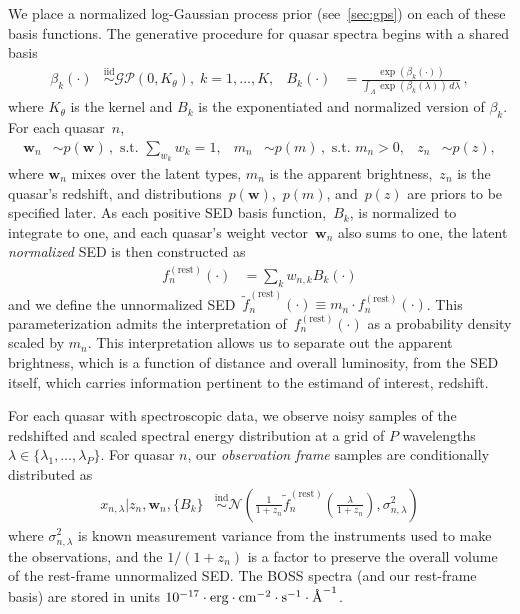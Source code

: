 \documentclass{article} %
\begin{document}
We place a normalized log-Gaussian process prior (see~\ref{sec:gps}) on each of these basis functions.  
The generative procedure for quasar spectra begins with a shared basis
\begin{align}
  \beta_k(\cdot) &\stackrel{\text{iid}}{\sim} \mathcal{GP}(0, K_\theta),\; k=1, \dots, K,&
  B_k(\cdot) &= \frac{\exp(\beta_k(\cdot))}{\int_\Lambda \exp(\beta_k(\lambda))\, d\lambda}   \, ,
\end{align}
where $K_{\theta}$ is the kernel and $B_k$ is the exponentiated and normalized version of $\beta_k$. For each quasar~$n$,
\begin{align}
  \mathbf{w}_n &\sim p(\mathbf{w}) \, , \text{ s.t. } \sum_{w_k} w_k = 1, &
  m_n  &\sim p(m) \, , \text{ s.t. } m_n > 0, &
  z_n &\sim p(z),
\end{align}
where $\mathbf{w}_n$ mixes over the latent types, $m_n$ is the apparent brightness,~$z_n$ is the quasar's redshift, and distributions~$p(\mathbf{w})$,~$p(m)$, and~$p(z)$ are priors to be specified later.
As each positive SED basis function,~$B_k$, is normalized to integrate to one, and each quasar's weight vector~$\mathbf{w}_n$ also sums to one, the latent \emph{normalized} SED is then constructed as
\begin{align}
  f^{(\text{rest})}_n(\cdot) &= \sum_{k} w_{n,k} B_k(\cdot)
  \label{eqn:restsed}
\end{align}
and we define the unnormalized SED~${\tilde f^{(\text{rest})}_n(\cdot) \equiv m_n \cdot f^{(\text{rest})}_n(\cdot)}$. 
This parameterization admits the interpretation of~$f^{(\text{rest})}_n(\cdot)$ as a probability density scaled by $m_n$.  
This interpretation allows us to separate out the apparent brightness, which is a function of distance and overall luminosity, from the SED itself, which carries information pertinent to the estimand of interest, redshift. 

For each quasar with spectroscopic data, we observe noisy samples of the redshifted and scaled spectral energy distribution at a grid of $P$ wavelengths ${\lambda \in \{\lambda_1, \dots, \lambda_P \}}$.
For quasar $n$, our \emph{observation frame} samples are conditionally distributed as
\begin{align}
  x_{n, \lambda} | z_n, \mathbf{w}_n, \{ B_k \} 
    &\stackrel{\textrm{ind}}{\sim} \mathcal{N}\left( \frac{1}{1 + z_n} \tilde f_n^{(\text{rest})}\left( \frac{\lambda}{1 + z_n} \right), \sigma_{n,\lambda}^2 \right)
    \label{eq:spec} 
\end{align}
where $\sigma_{n, \lambda}^2$ is known measurement variance from the instruments used to make the observations, and the $1/(1+z_n)$ is a factor to preserve the overall volume of the rest-frame unnormalized SED. 
The BOSS spectra (and our rest-frame basis) are stored in units ${10^{-17} \cdot \text{erg} \cdot \text{cm}^{-2} \cdot \text{s}^{-1} \cdot \textup{\AA}^{-1}}$.  
\end{document}
